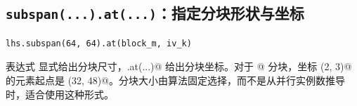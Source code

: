 \subsection*{\texttt{subspan(...).at(...)}：指定分块形状与坐标}

\begin{lstlisting}[language=croqtile,caption={subspan(...).at(...)：分块网格上显式指定分块范围}]
lhs.subspan(64, 64).at(block_m, iv_k)
\end{lstlisting}

表达式 \co@subspan@ 显式给出分块尺寸，\co@.at(...)@ 给出分块坐标。对于 \co@[16, 16]@ 分块，坐标 \co@(2, 3)@ 的元素起点是 \co@(32, 48)@。分块大小由算法固定选择，而不是从并行实例数推导时，适合使用这种形式。
